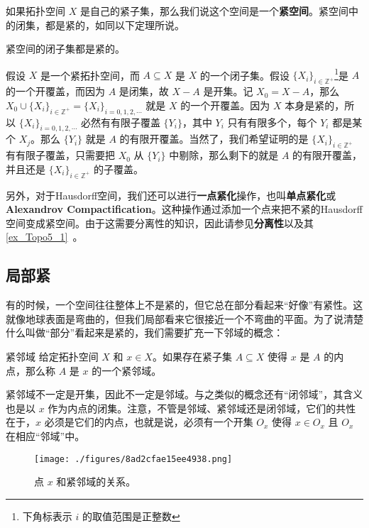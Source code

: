 如果拓扑空间 $X$ 是自己的紧子集，那么我们说这个空间是一个\textbf{紧空间}。紧空间中的闭集，都是紧的，如同以下定理所说。

\begin{theorem}{}\label{the_Topo2_2}
紧空间的闭子集都是紧的。
\end{theorem}

假设 $X$ 是一个紧拓扑空间，而 $A\subseteq X$ 是 $X$ 的一个闭子集。假设 $\{X_i\}_{i\in \mathbb{Z}^+}$\footnote{下角标表示 $i$ 的取值范围是正整数}是 $A$ 的一个开覆盖，而因为 $A$ 是闭集，故 $X-A$ 是开集。记 $X_0=X-A$，那么 $X_0\cup\{X_i\}_{i\in \mathbb{Z}^+}=\{X_i\}_{i=0, 1, 2, \cdots}$ 就是 $X$ 的一个开覆盖。因为 $X$ 本身是紧的，所以 $\{X_i\}_{i=0, 1, 2, \cdots}$ 必然有有限子覆盖 $\{Y_i\}$，其中 $Y_i$ 只有有限多个，每个 $Y_i$ 都是某个 $X_j$。那么 $\{Y_i\}$ 就是 $A$ 的有限开覆盖。当然了，我们希望证明的是 $\{X_i\}_{i\in \mathbb{Z}^+}$ 有有限子覆盖，只需要把 $X_0$ 从 $\{Y_i\}$ 中剔除，那么剩下的就是 $A$ 的有限开覆盖，并且还是 $\{X_i\}_{i\in \mathbb{Z}^+}$ 的子覆盖。

另外，对于Hausdorff空间，我们还可以进行\textbf{一点紧化}操作，也叫\textbf{单点紧化}或\textbf{Alexandrov Compactification}。这种操作通过添加一个点来把不紧的Hausdorff空间变成紧空间。由于这需要分离性的知识，因此请参见\textbf{分离性}以及其\autoref{ex_Topo5_1}~。

\subsection{局部紧}

有的时候，一个空间往往整体上不是紧的，但它总在部分看起来“好像”有紧性。这就像地球表面是弯曲的，但我们局部看来它很接近一个不弯曲的平面。为了说清楚什么叫做“部分”看起来是紧的，我们需要扩充一下邻域的概念：

\begin{definition}{紧邻域}
给定拓扑空间 $X$ 和 $x\in X$。如果存在紧子集 $A\subseteq X$ 使得 $x$ 是 $A$ 的内点，那么称 $A$ 是 $x$ 的一个紧邻域。
\end{definition}

紧邻域不一定是开集，因此不一定是邻域。与之类似的概念还有“闭邻域”，其含义也是以 $x$ 作为内点的闭集。注意，不管是邻域、紧邻域还是闭邻域，它们的共性在于，$x$ 必须是它们的内点，也就是说，必须有一个开集 $O_x$ 使得 $x\in O_x$ 且 $O_x$ 在相应“邻域”中。

\begin{figure}[ht]
\centering
\texttt{[image: ./figures/8ad2cfae15ee4938.png]}
\caption{点 $x$ 和紧邻域的关系。} \label{fig_Topo2_1}
\end{figure}


